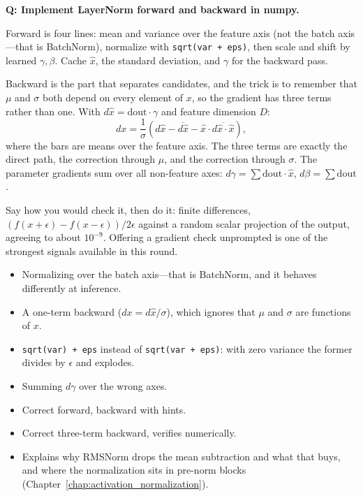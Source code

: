 \begin{interviewq}
\textbf{Q: Implement LayerNorm forward and backward in numpy.}

 \quad {} \quad \badgefreq{\freqmed}

\stronganswer

Forward is four lines: mean and variance over the feature axis (not the batch axis---that is BatchNorm), normalize with \texttt{sqrt(var + eps)}, then scale and shift by learned $\gamma, \beta$. Cache $\hat x$, the standard deviation, and $\gamma$ for the backward pass.

Backward is the part that separates candidates, and the trick is to remember that $\mu$ and $\sigma$ both depend on every element of $x$, so the gradient has three terms rather than one. With $d\hat x = \mathrm{dout} \cdot \gamma$ and feature dimension $D$:
\[
dx = \frac{1}{\sigma}\left(d\hat x - \overline{d\hat x} - \hat x \cdot \overline{d\hat x \cdot \hat x}\right),
\]
where the bars are means over the feature axis. The three terms are exactly the direct path, the correction through $\mu$, and the correction through $\sigma$. The parameter gradients sum over all non-feature axes: $d\gamma = \sum \mathrm{dout} \cdot \hat x$, $d\beta = \sum \mathrm{dout}$.

Say how you would check it, then do it: finite differences, $(f(x+\epsilon) - f(x-\epsilon))/2\epsilon$ against a random scalar projection of the output, agreeing to about $10^{-9}$. Offering a gradient check unprompted is one of the strongest signals available in this round.

\redflags
\begin{itemize}
    \item Normalizing over the batch axis---that is BatchNorm, and it behaves differently at inference.
    \item A one-term backward ($dx = d\hat x/\sigma$), which ignores that $\mu$ and $\sigma$ are functions of $x$.
    \item \texttt{sqrt(var) + eps} instead of \texttt{sqrt(var + eps)}: with zero variance the former divides by $\epsilon$ and explodes.
    \item Summing $d\gamma$ over the wrong axes.
\end{itemize}


\goodgreat
\begin{itemize}
    \item {} Correct forward, backward with hints.
    \item {} Correct three-term backward, verifies numerically.
    \item {} Explains why RMSNorm drops the mean subtraction and what that buys, and where the normalization sits in pre-norm blocks (Chapter~\ref{chap:activation_normalization}).
\end{itemize}


\end{interviewq}
